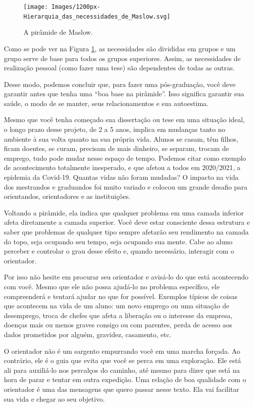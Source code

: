 \begin{figure}
	\centering
	\texttt{[image: Images/1200px-Hierarquia\_das\_necessidades\_de\_Maslow.svg]}
	\caption{A pirâmide de Maslow.}
	\label{fig:maslow}
\end{figure}


Como se pode ver na Figura \ref{fig:maslow}, as necessidades são divididas em grupos e um grupo serve de base para todos os grupos superiores. Assim, as necessidades de realização pessoal (como fazer uma tese) são dependentes de todas as outras. 

Desse modo, podemos concluir que, para fazer uma pós-graduação, você deve garantir antes que tenha uma “boa base na pirâmide”. Isso significa garantir sua saúde, o modo de se manter, seus relacionamentos e sua autoestima.

Mesmo que você tenha começado sua dissertação ou tese em uma situação ideal, o longo prazo desse projeto, de 2 a 5 anos, implica em mudanças tanto no ambiente à sua volta quanto na sua própria vida. Alunos se casam, têm filhos, ficam doentes, se curam, precisam de mais dinheiro, se separam, trocam de emprego, tudo pode mudar nesse espaço de tempo.
Podemos citar como exemplo de acontecimento totalmente inesperado, e que afetou a todos em 2020/2021, a epidemia da Covid-19. Quantas vidas não foram mudadas? O impacto na vida dos mestrandos e graduandos foi muito variado e colocou um grande desafio para orientandos, orientadores e as instituições.

Voltando a pirâmide, ela indica que qualquer problema em uma camada inferior afeta diretamente a camada superior. Você deve estar consciente dessa estrutura e saber que problemas de qualquer tipo sempre afetarão seu rendimento na camada do topo, seja ocupando seu tempo, seja ocupando sua mente. Cabe ao aluno perceber e controlar o grau desse efeito e, quando necessário, interagir com o orientador.

Por isso não hesite em procurar seu orientador e avisá-lo do que está acontecendo com você. Mesmo que ele não possa ajudá-lo no problema específico, ele compreenderá e tentará ajudar no que for possível. 
Exemplos típicos de coisas que acontecem na vida de um aluno: um novo emprego ou uma situação de desemprego, troca de chefes que afeta a liberação ou o interesse da empresa, doenças mais ou menos graves consigo ou com parentes, perda de acesso aos dados prometidos por alguém, gravidez, casamento, etc.

O orientador não é um sargento empurrando você em uma marcha forçada. Ao contrário, ele é o guia que evita que você se perca em uma exploração. 
Ele está ali para auxiliá-lo nos percalços do caminho, até mesmo para dizer que está na hora de parar e tentar em outra expedição. 
Uma relação de boa qualidade com o orientador é uma das mensagens que quero passar nesse texto. Ela vai facilitar sua vida e chegar ao seu objetivo.

